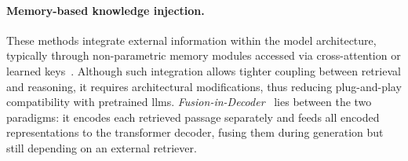 

\paragraph{Memory-based knowledge injection.}
These methods integrate external information within the model architecture, typically through non-parametric memory modules accessed via cross-attention or learned keys~\cite{wu-etal-2022-efficient,yang2024memory3,deJong2022MentionMemory,pmlr-v162-borgeaud22a}. Although such integration allows tighter coupling between retrieval and reasoning, it requires architectural modifications, thus reducing plug-and-play compatibility with pretrained \acp{llm}.  
\emph{Fusion-in-Decoder}~\cite{izacard-grave-2021-leveraging} lies between the two paradigms: it encodes each retrieved passage separately and feeds all encoded representations to the transformer decoder, fusing them during generation but still depending on an external retriever.






